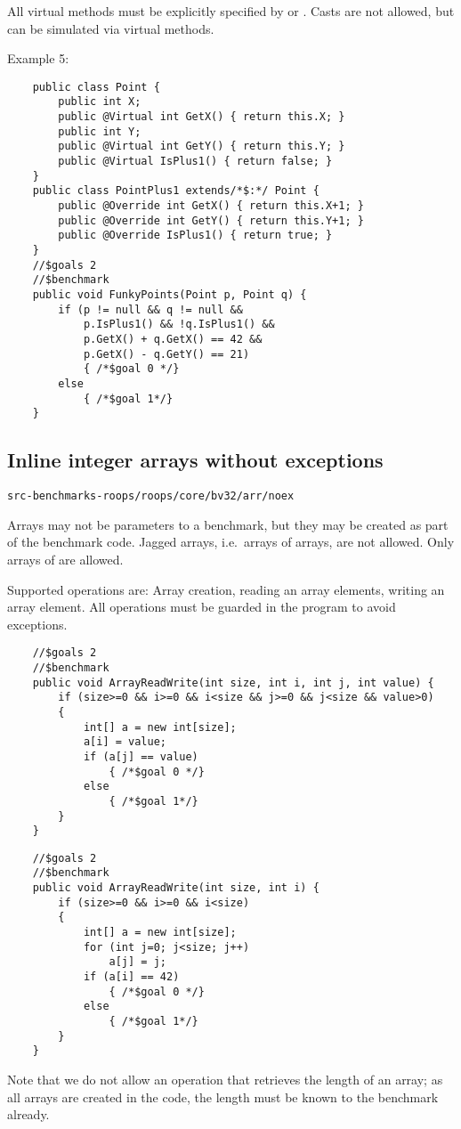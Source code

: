 All virtual methods must be explicitly specified by  or .
Casts are not allowed, but can be simulated via virtual methods.

Example 5:
\begin{verbatim}
    public class Point {
        public int X;
        public @Virtual int GetX() { return this.X; }
        public int Y;
        public @Virtual int GetY() { return this.Y; }
        public @Virtual IsPlus1() { return false; }
    }
    public class PointPlus1 extends/*$:*/ Point {
        public @Override int GetX() { return this.X+1; }
        public @Override int GetY() { return this.Y+1; }
        public @Override IsPlus1() { return true; }
    }
    //$goals 2
    //$benchmark
    public void FunkyPoints(Point p, Point q) {
        if (p != null && q != null &&
            p.IsPlus1() && !q.IsPlus1() &&
            p.GetX() + q.GetX() == 42 &&
            p.GetX() - q.GetY() == 21)
            { /*$goal 0 */}
        else
            { /*$goal 1*/}
    }
\end{verbatim}


\subsection{Inline integer arrays without exceptions}

\verb|src-benchmarks-roops/roops/core/bv32/arr/noex|

Arrays may not be parameters to a benchmark,
but they may be created as part of the benchmark code.
Jagged arrays, i.e.\ arrays of arrays, are not allowed.
Only arrays of  are allowed.

Supported operations are: Array creation, reading an array elements, writing an array element.
All operations must be guarded in the program to avoid exceptions.

\begin{verbatim}
    //$goals 2
    //$benchmark
    public void ArrayReadWrite(int size, int i, int j, int value) {
        if (size>=0 && i>=0 && i<size && j>=0 && j<size && value>0)
        {
            int[] a = new int[size];
            a[i] = value;
            if (a[j] == value)
                { /*$goal 0 */}
            else
                { /*$goal 1*/}
        }
    }
\end{verbatim}

\begin{verbatim}
    //$goals 2
    //$benchmark
    public void ArrayReadWrite(int size, int i) {
        if (size>=0 && i>=0 && i<size)
        {
            int[] a = new int[size];
            for (int j=0; j<size; j++)
                a[j] = j;
            if (a[i] == 42)
                { /*$goal 0 */}
            else
                { /*$goal 1*/}
        }
    }
\end{verbatim}

Note that we do not allow an operation that retrieves the length of an array;
as all arrays are created in the code, the length must be known to the benchmark already.